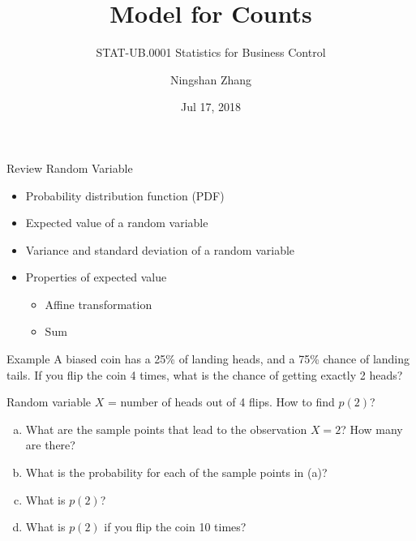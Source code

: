 \documentclass{beamer}
\title{Model for Counts}
\subtitle{STAT-UB.0001 Statistics for Business Control}
\author{Ningshan Zhang}
\institute[New York University] %
{
  IOMS Department\\
  nzhang@stern.nyu.edu
  \let\thefootnote\relax\footnotetext{\tiny{*  Office Hours: Wed \& Fri 10:00 - 11:30 AM, KMC 8-174}}
}
\date{Jul 17, 2018}
\begin{document}
\begin{frame}
  \titlepage
\end{frame}



\begin{frame}{Review}
Random Variable
\begin{itemize}
\item Probability distribution function (PDF)
    \item Expected value of a random variable
    \item Variance and standard deviation of a random variable
    \item Properties of expected value
\begin{itemize}
\item Affine transformation
\item Sum
\end{itemize}
\end{itemize}
\end{frame}

\begin{frame}{Example}
A biased coin has a 25\% of landing heads, and a 75\% chance of landing tails.
If you flip the coin 4 times, what is the chance of getting exactly 2 heads?

Random variable $X$ = number of heads out of 4 flips. How to find $p(2)$?
\small
\begin{enumerate}[(a)]
\item What are the sample points that lead to the observation $X=2$?  How many are there?
\item What is the probability for each of the sample points in (a)?
\item What is $p(2)$?
\item What is $p(2)$ if you flip the coin 10 times?
\end{enumerate}
\normalsize
\end{frame}
\end{document}
